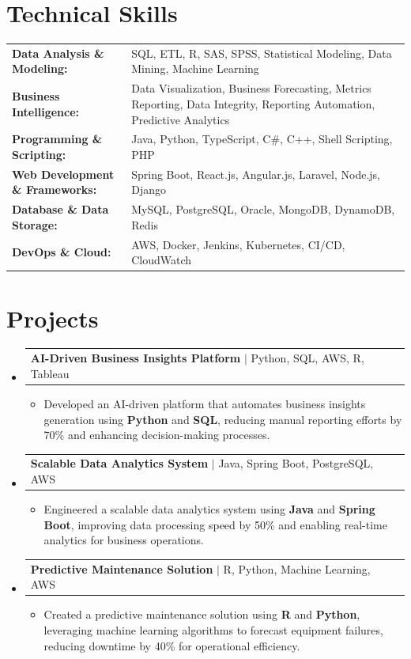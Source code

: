 \documentclass[letterpaper,10pt]{article}
\makeatletter
\newcommand{\resumeItem}[1]{
  \item{\fontsize{8pt}{9pt}\selectfont
    #1 \vspace{-3pt}
  }
}
\newcommand{\resumeProjectHeading}[2]{
    \item
    \begin{tabular*}{1.001\textwidth}{l@{\extracolsep{\fill}}r}
      \fontsize{8.5pt}{10pt}#1 & \textbf{\fontsize{8.5pt}{10pt} #2}\\
    \end{tabular*}\vspace{-7pt}
}
\newcommand{\resumeSubHeadingListStart}{\begin{itemize}[leftmargin=0pt, label={}]}
\newcommand{\resumeSubHeadingListEnd}{\end{itemize}}
\newcommand{\resumeItemListStart}{\begin{itemize}[leftmargin=*]}
\newcommand{\resumeItemListEnd}{\end{itemize}\vspace{-5pt}}
\makeatother
\begin{document}
\section{Technical Skills}
        \vspace{-14pt}
        \begin{table}[h]
            \fontsize{8pt}{9pt}\selectfont
            \begin{tabular}{p{0.3\linewidth} p{0.7\linewidth}}
                \textbf{Data Analysis \& Modeling:} & SQL, ETL, R, SAS, SPSS, Statistical Modeling, Data Mining, Machine Learning \\
                \textbf{Business Intelligence:} & Data Visualization, Business Forecasting, Metrics Reporting, Data Integrity, Reporting Automation, Predictive Analytics \\
                \textbf{Programming \& Scripting:} & Java, Python, TypeScript, C\#, C++, Shell Scripting, PHP \\
                \textbf{Web Development \& Frameworks:} & Spring Boot, React.js, Angular.js, Laravel, Node.js, Django \\
                \textbf{Database \& Data Storage:} & MySQL, PostgreSQL, Oracle, MongoDB, DynamoDB, Redis \\
                \textbf{DevOps \& Cloud:} & AWS, Docker, Jenkins, Kubernetes, CI/CD, CloudWatch \\
            \end{tabular}
        \end{table}
 \vspace{-18pt}

\section{Projects}
    \vspace{-5pt}
    \resumeSubHeadingListStart
          \resumeProjectHeading
            {\textbf{AI-Driven Business Insights Platform} $|$ Python, SQL, AWS, R, Tableau}{}
            \resumeItemListStart
                \resumeItem{Developed an AI-driven platform that automates business insights generation using \textbf{Python} and \textbf{SQL}, reducing manual reporting efforts by 70\% and enhancing decision-making processes.}
            \resumeItemListEnd
        \vspace{-12pt}
    
        \resumeProjectHeading
            {\textbf{Scalable Data Analytics System} $|$ Java, Spring Boot, PostgreSQL, AWS}{}
        \resumeItemListStart
                \resumeItem{Engineered a scalable data analytics system using \textbf{Java} and \textbf{Spring Boot}, improving data processing speed by 50\% and enabling real-time analytics for business operations.}
        \resumeItemListEnd
      \vspace{-12pt}
      \resumeProjectHeading
        {\textbf{Predictive Maintenance Solution} $|$ R, Python, Machine Learning, AWS}{}
    \resumeItemListStart
            \resumeItem{Created a predictive maintenance solution using \textbf{R} and \textbf{Python}, leveraging machine learning algorithms to forecast equipment failures, reducing downtime by 40\% for operational efficiency.}
    \resumeItemListEnd
    \resumeSubHeadingListEnd
\end{document}
